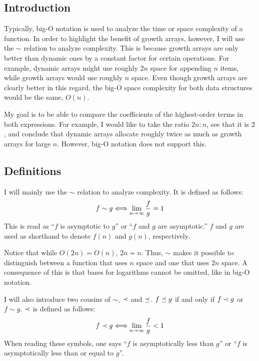 \subsection{Introduction}

Typically, big-O notation is used to analyze the time or space complexity of a function. In order to highlight the benefit of growth arrays, however, I will use the $\sim$ relation to analyze complexity. This is because growth arrays are only better than dynamic ones by a constant factor for certain operations. For example, dynamic arrays might use roughly $2n$ space for appending $n$ items, while growth arrays would use roughly $n$ space. Even though growth arrays are clearly better in this regard, the big-O space complexity for both data structures would be the same, $O(n)$.

My goal is to be able to compare the coefficients of the highest-order terms in both expressions. For example, I would like to take the ratio $2n : n$, see that it is $2$, and conclude that dynamic arrays allocate roughly twice as much as growth arrays for large $n$. However, big-O notation does not support this.

\subsection{Definitions}

I will mainly use the $\sim$ relation to analyze complexity. It is defined as follows:
\begin{align*}
f \sim g \Longleftrightarrow \lim_{n \to \infty} \frac f g = 1
\end{align*}
This is read as ``$f$ is asymptotic to $g$'' or ``$f$ and $g$ are asymptotic.'' {\HdrNote} $f$ and $g$ are used as shorthand to denote $f(n)$ and $g(n)$, respectively.

Notice that while $O(2n) = O(n)$, $2n \not\sim n$. Thus, $\sim$ makes it possible to distinguish between a function that uses $n$ space and one that uses $2n$ space. {\HdrNote} A consequence of this is that bases for logarithms cannot be omitted, like in big-O notation.

I will also introduce two cousins of $\sim$, $\prec$ and $\preceq$. $f \preceq g$ if and only if $f \prec g$ or $f \sim g$. $\prec$ is defined as follows:
\begin{align*}
f \prec g \Longleftrightarrow \lim_{n \to \infty} \frac f g < 1
\end{align*}
When reading these symbols, one says ``$f$ is asymptotically less than $g$'' or ``$f$ is asymptotically less than or equal to $g$''.

